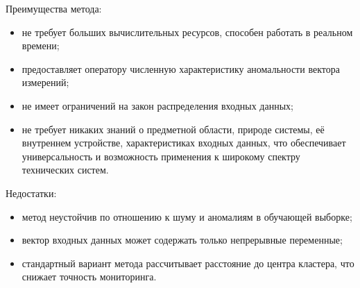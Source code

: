 Преимущества метода:
\begin{itemize}
	\item не требует больших вычислительных ресурсов, способен работать в реальном времени;
	\item предоставляет оператору численную характеристику аномальности вектора измерений;
	\item не имеет ограничений на закон распределения входных данных;
	\item не требует никаких знаний о предметной области, природе системы, её внутреннем устройстве, характеристиках входных данных, что обеспечивает универсальность и возможность применения к широкому спектру технических систем.
\end{itemize}

Недостатки:
\begin{itemize}
	\item метод неустойчив по отношению к шуму и аномалиям в обучающей выборке; 
	\item вектор входных данных может содержать только непрерывные переменные;
	\item стандартный вариант метода рассчитывает расстояние до центра кластера, что снижает точность мониторинга.
\end{itemize}